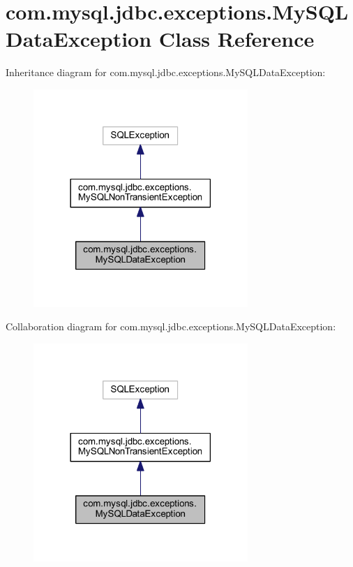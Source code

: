 \hypertarget{classcom_1_1mysql_1_1jdbc_1_1exceptions_1_1_my_s_q_l_data_exception}{}\section{com.\+mysql.\+jdbc.\+exceptions.\+My\+S\+Q\+L\+Data\+Exception Class Reference}
\label{classcom_1_1mysql_1_1jdbc_1_1exceptions_1_1_my_s_q_l_data_exception}


Inheritance diagram for com.\+mysql.\+jdbc.\+exceptions.\+My\+S\+Q\+L\+Data\+Exception\+:
\nopagebreak
\begin{figure}[H]
\begin{center}
\leavevmode
\includegraphics[width=230pt]{classcom_1_1mysql_1_1jdbc_1_1exceptions_1_1_my_s_q_l_data_exception__inherit__graph}
\end{center}
\end{figure}


Collaboration diagram for com.\+mysql.\+jdbc.\+exceptions.\+My\+S\+Q\+L\+Data\+Exception\+:
\nopagebreak
\begin{figure}[H]
\begin{center}
\leavevmode
\includegraphics[width=230pt]{classcom_1_1mysql_1_1jdbc_1_1exceptions_1_1_my_s_q_l_data_exception__coll__graph}
\end{center}
\end{figure}
